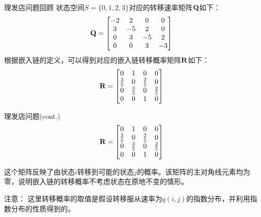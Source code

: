 \documentclass[t]{beamer}
\begin{document}
\begin{frame}{理发店问题回顾}
  状态空间$S=\{0,1,2,3\}$对应的转移速率矩阵$\bf Q$如下：
  \begin{equation*}
  {\bf Q}=\begin{bmatrix}
  -2 & 2 & 0&0\\
  3&-5&2&0\\
  0&3&-5&2\\
  0&0&3&-3
  \end{bmatrix}
  \end{equation*}
  根据嵌入链的定义，可以得到对应的嵌入链转移概率矩阵$\bf R$如下：
  \begin{equation*}
  {\bf R}=\begin{bmatrix}
  0 & 1 & 0&0\\
\frac{3}{5}&0&\frac{2}{5}&0\\
0&\frac{3}{5}&0&\frac{2}{5}\\
  0&0&1&0
  \end{bmatrix}
  \end{equation*}
\end{frame}

\begin{frame}{理发店问题(cont.)}
  \begin{equation*}
    {\bf R}=\begin{bmatrix}
    0 & 1 & 0&0\\
  \frac{3}{5}&0&\frac{2}{5}&0\\
  0&\frac{3}{5}&0&\frac{2}{5}\\
    0&0&1&0
    \end{bmatrix}
    \end{equation*}

    这个矩阵反映了由状态$i$转移到可能的状态$j$的概率。该矩阵的主对角线元素均为零，说明嵌入链的转移概率不考虑状态在原地不变的情形。

    \begin{block}{注意：}
      这里转移概率的取值是假设转移服从速率为$q(i,j)$的指数分布，并利用指数分布的性质得到的。
    \end{block}
\end{frame}
\end{document}
